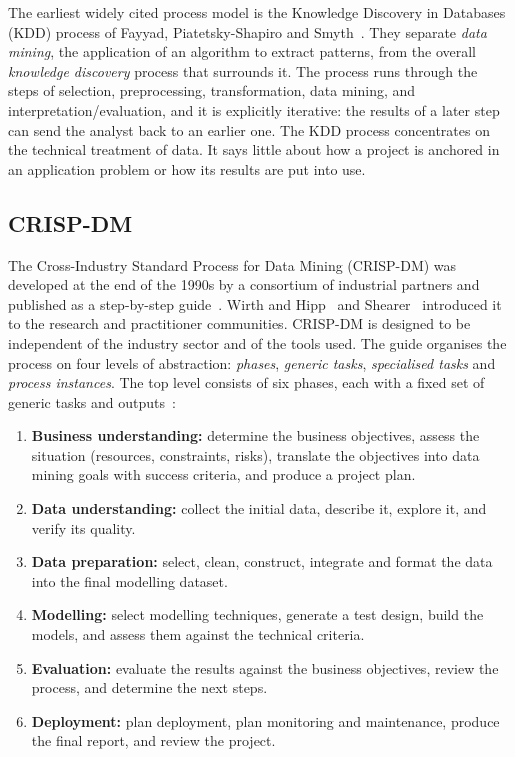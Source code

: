\documentclass[11pt,a4paper]{article}
\begin{document}
The earliest widely cited process model is the Knowledge Discovery in Databases
(KDD) process of Fayyad, Piatetsky-Shapiro and Smyth~\cite{fayyad1996}. They
separate \emph{data mining}, the application of an algorithm to extract
patterns, from the overall \emph{knowledge discovery} process that surrounds it.
The process runs through the steps of selection, preprocessing, transformation,
data mining, and interpretation/evaluation, and it is explicitly iterative: the
results of a later step can send the analyst back to an earlier one. The KDD
process concentrates on the technical treatment of data. It says little about
how a project is anchored in an application problem or how its results are put
into use.

\subsection{CRISP-DM}

The Cross-Industry Standard Process for Data Mining (CRISP-DM) was developed at
the end of the 1990s by a consortium of industrial partners and published as a
step-by-step guide~\cite{chapman2000}. Wirth and Hipp~\cite{wirth2000} and
Shearer~\cite{shearer2000} introduced it to the research and practitioner
communities. CRISP-DM is designed to be independent of the industry sector and
of the tools used. The guide organises the process on four levels of
abstraction: \emph{phases}, \emph{generic tasks}, \emph{specialised tasks} and
\emph{process instances}. The top level consists of six phases, each with a
fixed set of generic tasks and outputs~\cite{chapman2000}:

\begin{enumerate}[label=\arabic*.]
  \item \textbf{Business understanding:} determine the business objectives,
        assess the situation (resources, constraints, risks), translate the
        objectives into data mining goals with success criteria, and produce a
        project plan.
  \item \textbf{Data understanding:} collect the initial data, describe it,
        explore it, and verify its quality.
  \item \textbf{Data preparation:} select, clean, construct, integrate and
        format the data into the final modelling dataset.
  \item \textbf{Modelling:} select modelling techniques, generate a test design,
        build the models, and assess them against the technical criteria.
  \item \textbf{Evaluation:} evaluate the results against the business
        objectives, review the process, and determine the next steps.
  \item \textbf{Deployment:} plan deployment, plan monitoring and maintenance,
        produce the final report, and review the project.
\end{enumerate}
\end{document}
